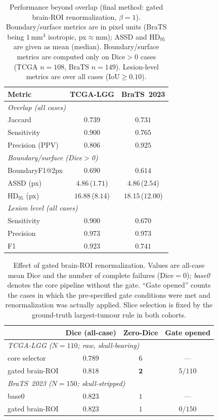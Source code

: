 \documentclass[11pt,a4paper]{article}
\begin{document}
\begin{table}[htpb!]\centering
\caption{Performance beyond overlap (final method: gated brain-ROI
renormalization, $\beta{=}1$). Boundary/surface metrics are in pixel units (BraTS
being $1\,\text{mm}^3$ isotropic, px$\approx$mm); ASSD and HD$_{95}$ are given as
mean (median). Boundary/surface metrics are computed only on Dice$>$0 cases (TCGA
$n{=}108$, BraTS $n{=}149$). Lesion-level metrics are over all cases
(IoU$\ge 0.10$).}
\label{tab:fullmetrics}
\begin{tabular}{lcc}
\toprule
Metric & TCGA-LGG & BraTS~2023 \\
\midrule
\multicolumn{3}{l}{\emph{Overlap (all cases)}}\\
\quad Jaccard         & $0.739$ & $0.731$ \\
\quad Sensitivity     & $0.900$ & $0.765$ \\
\quad Precision (PPV) & $0.806$ & $0.925$ \\
\midrule
\multicolumn{3}{l}{\emph{Boundary/surface (Dice$>$0)}}\\
\quad BoundaryF1@2px & $0.690$ & $0.614$ \\
\quad ASSD (px)      & $4.86$\,($1.71$) & $4.86$\,($2.54$) \\
\quad HD$_{95}$ (px) & $16.88$\,($8.14$) & $18.15$\,($12.00$) \\
\midrule
\multicolumn{3}{l}{\emph{Lesion level (all cases)}}\\
\quad Sensitivity   & $0.900$ & $0.670$ \\
\quad Precision     & $0.973$ & $0.973$ \\
\quad F1            & $0.923$ & $0.741$ \\
\bottomrule
\end{tabular}
\end{table}

\begin{table}[htpb!]\centering
\caption{Effect of gated brain-ROI renormalization. Values are all-case mean Dice
and the number of complete failures (Dice$=0$); \emph{base0} denotes the core
pipeline without the gate. ``Gate opened'' counts the cases in which the
pre-specified gate conditions were met and renormalization was actually applied.
Slice selection is fixed by the ground-truth largest-tumour rule in both cohorts.}
\label{tab:roi}
\begin{tabular}{lccc}
\toprule
& Dice (all-case) & Zero-Dice & Gate opened \\
\midrule
\multicolumn{4}{l}{\emph{TCGA-LGG ($N{=}110$; raw, skull-bearing)}}\\
\quad core selector & $0.789$ & $6$ & --- \\
\quad gated brain-ROI & $\mathbf{0.818}$ & $\mathbf{2}$ & $5/110$ \\
\midrule
\multicolumn{4}{l}{\emph{BraTS~2023 ($N{=}150$; skull-stripped)}}\\
\quad base0 & $0.823$ & $1$ & --- \\
\quad gated brain-ROI & $0.823$ & $1$ & $0/150$ \\
\bottomrule
\end{tabular}
\end{table}
\end{document}
